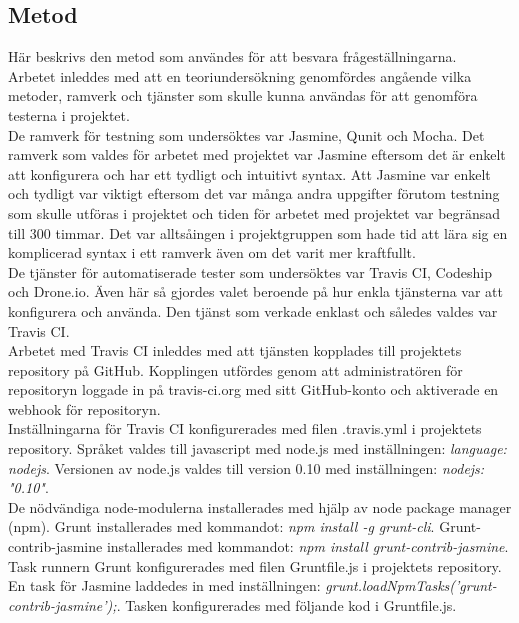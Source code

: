 \subsection{Metod}
Här beskrivs den metod som användes för att 
besvara frågeställningarna.\\

Arbetet inleddes med att en teoriundersökning genomfördes
angående vilka metoder, ramverk och tjänster som skulle kunna
användas för att genomföra testerna i projektet.\\

De ramverk för
testning som undersöktes var Jasmine, Qunit och Mocha. Det
ramverk som valdes för arbetet med projektet var Jasmine
eftersom det är enkelt att konfigurera och har ett 
tydligt och intuitivt syntax. Att Jasmine var enkelt och tydligt
var viktigt eftersom det var många andra uppgifter förutom
testning som skulle utföras i projektet och tiden för
arbetet med projektet var begränsad till 300 timmar. Det var
alltsåingen i projektgruppen som hade tid att lära sig 
en komplicerad syntax i ett ramverk även om det varit
mer kraftfullt.\\

De tjänster för automatiserade tester som undersöktes var
Travis CI, Codeship och Drone.io. Även här 
så gjordes valet beroende på hur enkla tjänsterna var att
konfigurera och använda. Den tjänst som verkade enklast
och således valdes var Travis CI.\\

Arbetet med Travis CI inleddes med att tjänsten kopplades till 
projektets repository på GitHub. Kopplingen utfördes
genom att administratören för repositoryn loggade in på travis-ci.org med 
sitt GitHub-konto och aktiverade
en webhook för repositoryn.\\

Inställningarna för Travis CI konfigurerades med filen .travis.yml i projektets
repository. Språket valdes till
javascript med node.js med inställningen: \emph{language: node\textunderscore js}.
Versionen av node.js valdes till version 0.10
med inställningen: \emph{node\textunderscore js: "0.10"}.\\

De nödvändiga node-modulerna installerades med hjälp av node package manager (npm).
Grunt installerades
med kommandot: \emph{npm install -g grunt-cli}. Grunt-contrib-jasmine installerades med kommandot: 
\emph{npm install grunt-contrib-jasmine}.\\

Task runnern Grunt konfigurerades med filen Gruntfile.js i projektets repository.
En task för Jasmine laddedes in med
inställningen: \emph{grunt.loadNpmTasks('grunt-contrib-jasmine');}.
Tasken konfigurerades med följande kod i Gruntfile.js.

